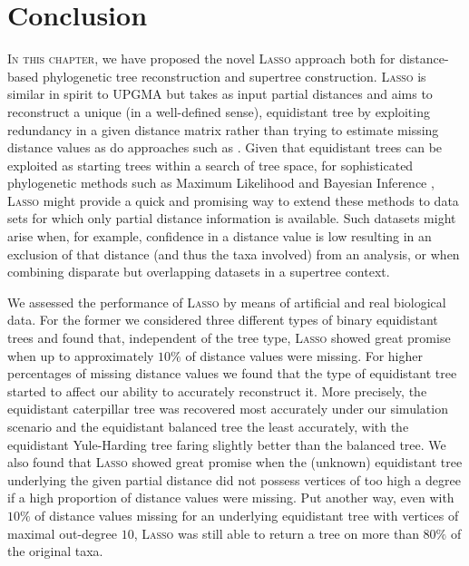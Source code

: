 \section{Conclusion}
\label{sec:conclusion}

\textsc{In this chapter}, we have proposed the novel \textsc{Lasso} approach
both for distance-based phylogenetic tree reconstruction and supertree
construction.  \textsc{Lasso} is similar in spirit to \textsc{UPGMA} but takes
as input partial distances and aims to reconstruct a unique (in a well-defined
sense), equidistant tree by exploiting redundancy in a given distance matrix
rather than trying to estimate missing distance values as do approaches such
as \cite{criscuolo2008fastnj}. Given that equidistant trees can be exploited
as starting trees within a search of tree space, for sophisticated
phylogenetic methods such as Maximum Likelihood and Bayesian Inference
\cite{burbrink09molecular,bouckaert14beast}, \textsc{Lasso} might provide a
quick and promising way to extend these methods to data sets for which only
partial distance information is available. Such datasets might arise when, for
example, confidence in a distance value is low resulting in an exclusion of
that distance (and thus the taxa involved) from an analysis, or when combining
disparate but overlapping datasets in a supertree context.

We assessed the performance of \textsc{Lasso} by means of artificial and real
biological data.  For the former we considered three different types of binary
equidistant trees and found that, independent of the tree type, \textsc{Lasso}
showed great promise when up to approximately $10\%$ of distance values were
missing.  For higher percentages of missing distance values we found that the
type of equidistant tree started to affect our ability to accurately
reconstruct it. More precisely, the equidistant caterpillar tree was recovered
most accurately under our simulation scenario and the equidistant balanced
tree the least accurately, with the equidistant Yule-Harding tree faring
slightly better than the balanced tree.  We also found that \textsc{Lasso}
showed great promise when the (unknown) equidistant tree underlying the given
partial distance did not possess vertices of too high a degree if a high
proportion of distance values were missing.  Put another way, even with $10\%$
of distance values missing for an underlying equidistant tree with vertices of
maximal out-degree $10$, \textsc{Lasso} was still able to return a tree on
more than $80\%$ of the original taxa.

